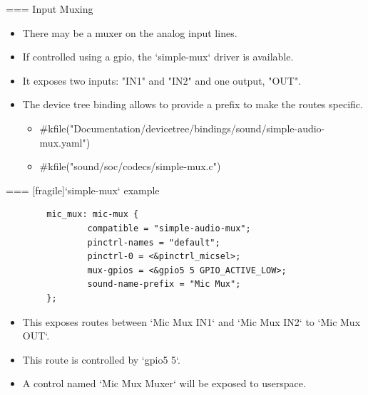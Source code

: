 === {Input Muxing}
  \begin{itemize}
  \item There may be a muxer on the analog input lines.
  \item If controlled using a gpio, the `simple-mux` driver is
    available.
  \item It exposes two inputs: "IN1" and "IN2" and one output, "OUT".
  \item The device tree binding allows to provide a prefix to make the
    routes specific.
    \begin{itemize}
      \item #kfile("Documentation/devicetree/bindings/sound/simple-audio-mux.yaml")
      \item #kfile("sound/soc/codecs/simple-mux.c")
    \end{itemize}
  \end{itemize}


=== [fragile]{`simple-mux` example}
  \begin{block}{}
    \fontsize{8}{8}\selectfont
    \begin{verbatim}
        mic_mux: mic-mux {
                compatible = "simple-audio-mux";
                pinctrl-names = "default";
                pinctrl-0 = <&pinctrl_micsel>;
                mux-gpios = <&gpio5 5 GPIO_ACTIVE_LOW>;
                sound-name-prefix = "Mic Mux";
        };
    \end{verbatim}
  \end{block}
  \begin{itemize}
  \item This exposes routes between `Mic Mux IN1` and `Mic
    Mux IN2` to `Mic Mux OUT`.
  \item This route is controlled by `gpio5 5`.
  \item A control named `Mic Mux Muxer` will be exposed to
    userspace.
  \end{itemize}


